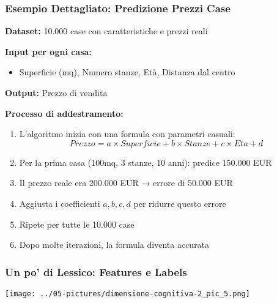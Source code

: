 \documentclass[aspectratio=169]{beamer}
\begin{document}
\begin{frame}
\frametitle{Esempio Dettagliato: Predizione Prezzi Case}
\textbf{Dataset:} 10.000 case con caratteristiche e prezzi reali

\textbf{Input per ogni casa:}
\begin{itemize}
\item Superficie (mq), Numero stanze, Età, Distanza dal centro
\end{itemize}

\textbf{Output:} Prezzo di vendita

\textbf{Processo di addestramento:}
\begin{enumerate}
\item L'algoritmo inizia con una formula con parametri casuali: 
$$Prezzo = a \times Superficie + b \times Stanze + c \times Eta + d$$
\item Per la prima casa (100mq, 3 stanze, 10 anni): predice 150.000 EUR
\item Il prezzo reale era 200.000 EUR → errore di 50.000 EUR
\item Aggiusta i coefficienti $a, b, c, d$ per ridurre questo errore
\item Ripete per tutte le 10.000 case
\item Dopo molte iterazioni, la formula diventa accurata
\end{enumerate}
\end{frame}
%
%
\begin{frame}
\frametitle{Un po' di Lessico: Features e Labels}
\begin{center}
\texttt{[image: ../05-pictures/dimensione-cognitiva-2\_pic\_5.png]} 
\end{center}
\end{frame}
%
\end{document}
